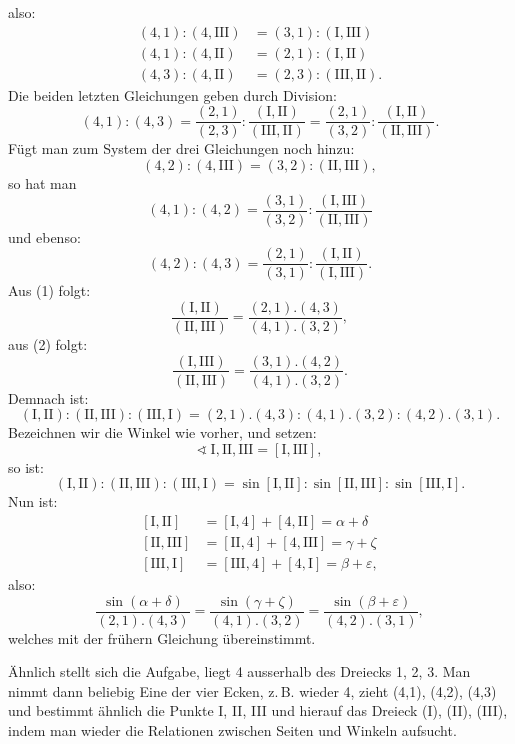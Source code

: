 also:
\[
\begin{array}{rl}
(4,1) : (4,\text{III}) & = (3,1) : (\text{I}, \text{III}) \\
(4,1) : (4,\text{II}) & = (2,1) : (\text{I}, \text{II}) \\
(4,3) : (4,\text{II}) & = (2,3) : (\text{III}, \text{II}).
\end{array}
\]
Die beiden letzten Gleichungen geben durch Division:
\begin{equation}
(4,1) : (4,3) = \frac{(2,1)}{(2,3)} : \frac{(\text{I}, \text{II})}{(\text{III}, \text{II})}
= \frac{(2,1)}{(3,2)} : \frac{(\text{I}, \text{II})}{(\text{II}, \text{III})}.
\tag{1}
\end{equation}
Fügt man zum System der drei Gleichungen noch hinzu:
\[
(4,2) : (4,\text{III}) = (3,2) : (\text{II}, \text{III}),
\]
so hat man
\begin{equation}
(4,1) : (4,2) = \frac{(3,1)}{(3,2)} : \frac{(\text{I}, \text{III})}{(\text{II}, \text{III})}
\tag{2}
\end{equation}
und ebenso:
\begin{equation}
(4,2) : (4,3) = \frac{(2,1)}{(3,1)} : \frac{(\text{I}, \text{II})}{(\text{I}, \text{III})}.
\tag{3}
\end{equation}
Aus (1) folgt:
\[
\frac{(\text{I}, \text{II})}{(\text{II}, \text{III})} = \frac{(2,1) . (4,3)}{(4,1) . (3,2)},
\]
aus (2) folgt:
\[
\frac{(\text{I}, \text{III})}{(\text{II}, \text{III})} = \frac{(3,1) . (4,2)}{(4,1) . (3,2)}.
\]
Demnach ist:
\[
(\text{I}, \text{II}) : (\text{II}, \text{III}) : (\text{III}, \text{I}) = (2,1) . (4,3) :
(4,1) . (3,2) : (4,2) . (3,1).
\]
Bezeichnen wir die Winkel wie vorher, und setzen:
\[
\sphericalangle\ \text{I}, \text{II}, \text{III} = [\text{I}, \text{III}],
\]
so ist:
\[
(\text{I}, \text{II}) : (\text{II}, \text{III}) : (\text{III}, \text{I}) = \sin[\text{I}, \text{II}] :
\sin[\text{II}, \text{III}] : \sin[\text{III}, \text{I}].
\]
Nun ist:
\[
\begin{array}{rl}
{[\text{I}, \text{II}]} & = [\text{I}, 4] + [4, \text{II}] = \alpha + \delta \\
{[\text{II}, \text{III}]} & = [\text{II}, 4] + [4, \text{III}] = \gamma + \zeta \\
{[\text{III}, \text{I}]} & = [\text{III}, 4] + [4, \text{I}] = \beta + \varepsilon,
\end{array}
\]
also:
\[
\frac{\sin(\alpha+\delta)}{(2,1) . (4,3)} = \frac{\sin(\gamma+\zeta)}{(4,1) . (3,2)} =
\frac{\sin(\beta+\varepsilon)}{(4,2) . (3,1)},
\]
welches mit der frühern Gleichung übereinstimmt.

Ähnlich stellt sich die Aufgabe, liegt 4 ausserhalb des Dreiecks 1, 2, 3. Man nimmt dann beliebig
Eine der vier Ecken, z.\,B. wieder 4, zieht (4,1), (4,2), (4,3) und bestimmt ähnlich die Punkte
I, II, III und hierauf das Dreieck (I), (II), (III), indem man wieder die Relationen zwischen
Seiten und Winkeln aufsucht.
